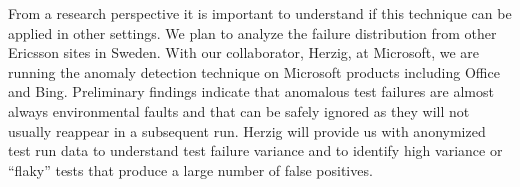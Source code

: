 From a research perspective it is important to understand if this technique can be applied in other settings. We plan to analyze the failure distribution from other Ericsson sites in Sweden. With our collaborator, Herzig, at Microsoft, we are running the anomaly detection technique on Microsoft products including Office and Bing. Preliminary findings indicate that anomalous test failures are almost always environmental faults and that can be safely ignored as they will not usually reappear in a subsequent run. Herzig will provide us with anonymized test run data to understand test failure variance and to identify high variance or ``flaky'' tests that produce a large number of false positives.


